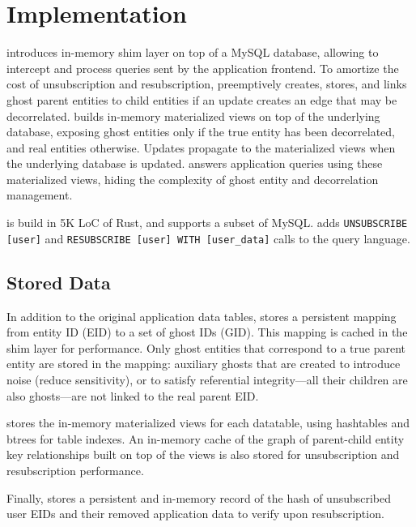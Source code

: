 \section{Implementation}

\sys introduces in-memory shim layer on top of a MySQL database, 
allowing \sys to intercept and process queries sent by the application frontend. 
To amortize the cost of unsubscription and resubscription, \sys preemptively creates, stores, and
links ghost parent entities to child entities if an update creates an edge that may be decorrelated.
\sys builds in-memory materialized views on top of the underlying database, exposing ghost
entities only if the true entity has been decorrelated, and real entities otherwise. Updates
propagate to the materialized views when the underlying database is updated. \sys answers
application queries using these materialized views, hiding the complexity of ghost entity and
decorrelation management.

\sys is build in 5K LoC of Rust, and supports a subset of MySQL. \sys adds \texttt{UNSUBSCRIBE
[user]} and \texttt{RESUBSCRIBE [user] WITH [user\_data]} calls to the query language.

\subsection{Stored Data}
In addition to the original application data tables, \sys stores a persistent mapping from entity
ID (EID) to a set of ghost IDs (GID). This mapping is cached in the shim layer for performance. Only
ghost entities that correspond to a true parent entity are stored in the mapping: auxiliary ghosts that are
created to introduce noise (reduce sensitivity), or to satisfy referential integrity---all their
children are also ghosts---are not linked to the real parent EID.

\sys stores the in-memory materialized views for each datatable, using hashtables and btrees for
table indexes. An in-memory cache of the graph of parent-child entity key relationships built on
top of the views is also stored for unsubscription and resubscription performance.

Finally, \sys stores a persistent and in-memory record of the hash of unsubscribed user EIDs 
and their removed application data to verify upon resubscription.

